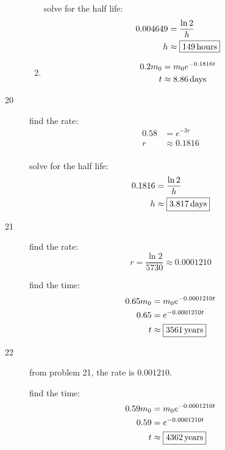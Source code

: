 \documentclass{exam}
\begin{document}
\begin{description}
\begin{enumerate}[a]
            solve for the half life:
            \begin{align*}
              0.004649 & = \frac{\ln 2}{h} \\
              h        & \approx \boxed{\unit[149]{hours}} \\
            \end{align*}

          \item
            \begin{align*}
              0.2 m_0 & = m_0 e^{-0.1816t} \\
              t       & \approx \unit[8.86]{days} \\
            \end{align*}

        \end{enumerate}

      \item[20]
        find the rate:
        \begin{align*}
          0.58 & = e^{-3r} \\
          r    & \approx 0.1816 \\
        \end{align*}

        solve for the half life:
        \begin{align*}
          0.1816 & = \frac{\ln 2}{h} \\
          h      & \approx \boxed{\unit[3.817]{days}} \\
        \end{align*}

      \item[21]
        find the rate: 
        \[
          r = \frac{\ln 2}{5730} \approx 0.0001210
        \]

        find the time:
        \begin{align*}
          0.65 m_0 & = m_0 e^{-0.0001210 t} \\
          0.65     & =  e^{-0.0001210 t} \\
          t        & \approx \boxed{\unit[3561]{years}} \\
        \end{align*}

      \item[22]
        from problem 21, the rate is $0.001210$.

        find the time:
        \begin{align*}
          0.59 m_0 & = m_0 e^{-0.0001210 t} \\
          0.59     & =  e^{-0.0001210 t} \\
          t        & \approx \boxed{\unit[4362]{years}} \\
        \end{align*}


\end{description}
\end{document}
